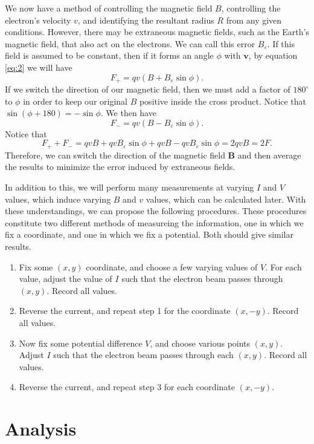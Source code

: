 \documentclass[11pt, letterpaper]{report}
\begin{document}
We now have a method of controlling the magnetic field $B$, controlling the electron's velocity $v$, and identifying the resultant radius $R$ from any given conditions. However, there may be extraneous magnetic fields, such as the Earth's magnetic field, that also act on the electrons. We can call this error $B_\varepsilon$. If this field is assumed to be constant, then if it forms an angle $\phi $ with $\mathbf{v}$, by equation \ref{eq:2} we will have
\[
	F_{+}=qv(B+B_{\varepsilon }\sin \phi )
.\]
If we switch the direction of our magnetic field, then we must add a factor of $180^\circ $ to $\phi $ in order to keep our original $B$ positive inside the cross product. Notice that $\sin \left( \phi +180 \right) =-\sin \phi $. We then have
\[
	F_{-}=qv(B-B_{\varepsilon }\sin \phi )
.\]
Notice that
\[
	F_{+}+F_{-}=qvB+qvB_{\varepsilon }\sin \phi +qvB-qvB_{\varepsilon }\sin \phi =2qvB=2F
.\]
Therefore, we can switch the direction of the magnetic field $\mathbf{B}$ and then average the results to minimize the error induced by extraneous fields.

In addition to this, we will perform many measurements at varying $I$ and $V$ values, which induce varying $B$ and $v$ values, which can be calculated later. With these understandings, we can propose the following procedures. These procedures constitute two different methods of measureing the information, one in which we fix a coordinate, and one in which we fix a potential. Both should give similar results.
\begin{enumerate}
	\item Fix some $(x,y)$ coordinate, and choose a few varying values of $V$. For each value, adjust the value of $I$ such that the electron beam passes through $(x,y)$. Record all values.
	\item Reverse the current, and repeat step 1 for the coordinate $(x,-y)$. Record all values.
	\item Now fix some potential difference $V$, and choose various points $(x,y)$. Adjust $I$ such that the electron beam passes through each $(x,y)$. Record all values.
	\item Reverse the current, and repeat step 3 for each coordinate $(x,-y)$.
\end{enumerate}
\section{Analysis}
\end{document}
